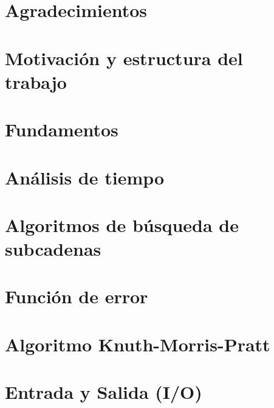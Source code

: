 \documentclass{book}
\begin{document}
\thispagestyle{empty}
\frontmatter
    
    \clearpage
    \mbox{}
    \clearpage
    \thispagestyle{empty}
    
    
    
    \chapter*{Agradecimientos}
    
    \clearpage
    
    \tableofcontents


\mainmatter
    \chapter*{Motivación y estructura del trabajo}
        
    
    \chapter{Fundamentos}
        
    
    \chapter{Análisis de tiempo}
        
    
    \chapter{Algoritmos de búsqueda de subcadenas}
        

    \chapter{Función de error}
        

    \chapter{Algoritmo Knuth-Morris-Pratt}
        

    \chapter{Entrada y Salida (I/O)}
        
\end{document}
